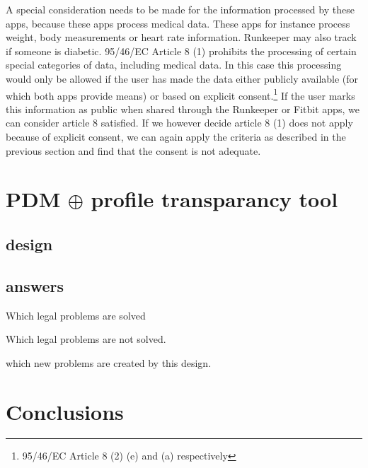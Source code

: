 \documentclass{article}
\begin{document}
A special consideration needs to be made for the information processed by these apps, because these apps process medical data.
These apps for instance process weight, body measurements or heart rate information.
Runkeeper may also track if someone is diabetic.
95/46/EC Article 8 (1) prohibits the processing of certain special categories of data, including medical data.
In this case this processing would only be allowed if the user has made the data either publicly available (for which both apps provide means) or based on explicit consent.\footnote{95/46/EC Article 8 (2) (e) and (a) respectively}
If the user marks this information as public when shared through the Runkeeper or Fitbit apps, we can consider article 8 satisfied.
If we however decide article 8 (1) does not apply because of explicit consent, we can again apply the criteria as described in the previous section and find that the consent is not adequate.

\section{PDM $\oplus$ profile transparancy tool}


\subsection{design}

\subsection{answers}

Which legal problems are solved

Which legal problems are not solved.

which new problems are created by this design.

\section{Conclusions}
\end{document}
